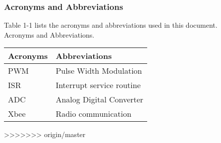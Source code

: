 \documentclass[MTRX3700report.tex]{subfiles}
\begin{document}
\subsubsection{ Acronyms and Abbreviations}
Table   1-1 lists the acronyms and abbreviations used in this document.\\
Acronyms and Abbreviations.
\begin{center}
	\begin{tabular}{| l | l | }
	\hline
	Acronyms & Abbreviations		\\ \hline
	PWM	& Pulse Width Modulation	\\ \hline
	ISR    & Interrupt service routine \\ \hline
	ADC  & Analog Digital Converter   \\ \hline
	Xbee & Radio communication	\\
	\hline
	\end{tabular}
\end{center}







>>>>>>> origin/master
\end{document}

